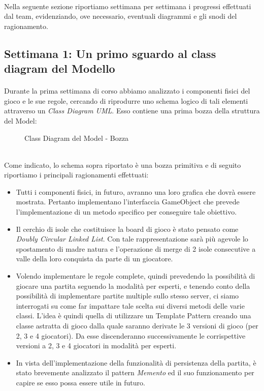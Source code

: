 \documentclass[a4paper, 12pt]{article}
\begin{document}
	\paragraph{}
	Nella seguente sezione riportiamo settimana per settimana i progressi effettuati dal team, evidenziando, ove necessario, eventuali diagrammi e gli snodi del ragionamento.
	\subsection{Settimana 1: Un primo sguardo al class diagram del Modello}
	\paragraph{}
	Durante la prima settimana di corso abbiamo analizzato i componenti fisici del gioco e le sue regole, cercando di riprodurre uno schema logico di tali elementi attraverso un \emph{Class Diagram UML}. Esso contiene una prima bozza della struttura del Model:\\
	\begin{figure}[h]
		\centering
		\def\svgwidth{\columnwidth}
		\resizebox{\linewidth}{!}{}
		\caption{Class Diagram del Model - Bozza}
	\end{figure}\\
	Come indicato, lo schema sopra riportato è una bozza primitiva e di seguito riportiamo i principali ragionamenti effettuati:\\
	\begin{itemize}
		\setlength{\parskip}{0pt}
		\setlength{\parsep}{0pt}
		
		\item Tutti i componenti fisici, in futuro, avranno una loro grafica che dovrà essere mostrata. Pertanto implementano l'interfaccia GameObject che prevede l'implementazione di un metodo specifico per conseguire tale obiettivo.
		\item Il cerchio di isole che costituisce la board di gioco è stato pensato come \emph{Doubly Circular Linked List}\cite{circularDoublyLinkedList}. Con tale rappresentazione sarà più agevole lo spostamento di madre natura e l'operazione di merge di 2 isole consecutive a valle della loro conquista da parte di un giocatore.
		\item Volendo implementare le regole complete, quindi prevedendo la possibilità di giocare una partita seguendo la modalità per esperti, e tenendo conto della possibilità di implementare partite multiple sullo stesso server, ci siamo interrogati su come far impattare tale scelta sui diversi metodi delle varie classi. L'idea è quindi quella di utilizzare un Template Pattern creando una classe astratta di gioco dalla quale saranno derivate le 3 versioni di gioco (per 2, 3 e 4 giocatori). Da esse discenderanno successivamente le corrispettive versioni a 2, 3 e 4 giocatori in modalità per esperti.
		\item In vista dell'implementazione della funzionalità di persistenza della partita, è stato brevemente analizzato il pattern \emph{Memento} ed il suo funzionamento per capire se esso possa essere utile in futuro.
	\end{itemize}
\end{document}
